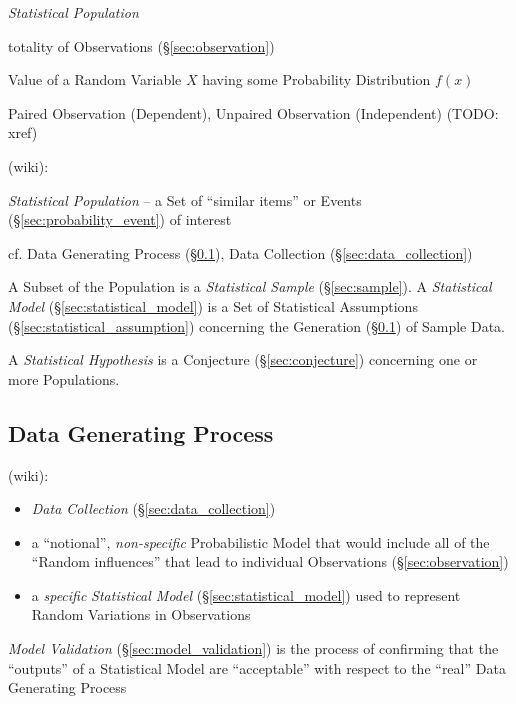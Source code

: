 \emph{Statistical Population}

totality of Observations (\S\ref{sec:observation})

Value of a Random Variable $X$ having some Probability Distribution $f(x)$

Paired Observation (Dependent), Unpaired Observation (Independent) (TODO: xref)

(wiki):

\emph{Statistical Population} -- a Set of ``similar items'' or Events
(\S\ref{sec:probability_event}) of interest

\fist cf. Data Generating Process (\S\ref{sec:data_generating_process}), Data
Collection (\S\ref{sec:data_collection})

A Subset of the Population is a \emph{Statistical Sample} (\S\ref{sec:sample}).
A \emph{Statistical Model} (\S\ref{sec:statistical_model}) is a Set of
Statistical Assumptions (\S\ref{sec:statistical_assumption}) concerning the
Generation (\S\ref{sec:data_generating_process}) of Sample Data.

A \emph{Statistical Hypothesis} is a Conjecture (\S\ref{sec:conjecture})
concerning one or more Populations.



\subsection{Data Generating Process}\label{sec:data_generating_process}

(wiki):

\begin{itemize}
  \item \emph{Data Collection} (\S\ref{sec:data_collection})
  \item a ``notional'', \emph{non-specific} Probabilistic Model
    that would include all of the ``Random influences'' that lead to individual
    Observations (\S\ref{sec:observation})
  \item a \emph{specific} \emph{Statistical Model}
    (\S\ref{sec:statistical_model}) used to represent Random Variations in
    Observations
\end{itemize}

\fist \emph{Model Validation} (\S\ref{sec:model_validation}) is the process of
confirming that the ``outputs'' of a Statistical Model are ``acceptable'' with
respect to the ``real'' Data Generating Process

